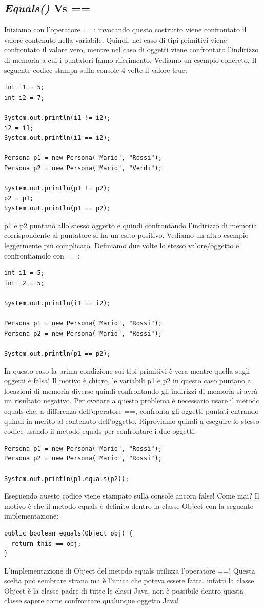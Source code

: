 \subsection{\textit{Equals()} Vs ==}
Iniziamo con l’operatore ==: invocando questo costrutto viene confrontato il valore contenuto nella variabile. Quindi, nel caso di tipi primitivi viene confrontato il valore vero, mentre nel caso di oggetti viene confrontato l’indirizzo di memoria a cui i puntatori fanno riferimento.
Vediamo un esempio concreto. Il seguente codice stampa sulla console 4 volte il valore true:
\begin{lstlisting}
int i1 = 5;
int i2 = 7;
 
System.out.println(i1 != i2);
i2 = i1;
System.out.println(i1 == i2);
 
Persona p1 = new Persona("Mario", "Rossi");
Persona p2 = new Persona("Mario", "Verdi");
 
System.out.println(p1 != p2);
p2 = p1;
System.out.println(p1 == p2);
\end{lstlisting}
p1 e p2 puntano allo stesso oggetto e quindi confrontando l’indirizzo di memoria corrispondente al puntatore si ha un esito positivo.
Vediamo un altro esempio leggermente più complicato. Definiamo due volte lo stesso valore/oggetto e confrontiamolo con ==:
\begin{lstlisting}
int i1 = 5;
int i2 = 5;
 
System.out.println(i1 == i2);
 
Persona p1 = new Persona("Mario", "Rossi");
Persona p2 = new Persona("Mario", "Rossi");
 
System.out.println(p1 == p2);
\end{lstlisting}
In questo caso la prima condizione sui tipi primitivi è vera mentre quella sugli oggetti è falsa! Il motivo è chiaro, le variabili p1 e p2 in questo caso puntano a locazioni di memoria diverse quindi confrontando gli indirizzi di memoria si avrà un risultato negativo. Per ovviare a questo problema è necessario usare il metodo equals che, a differenza dell’operatore ==, confronta gli oggetti puntati entrando quindi in merito al contenuto dell’oggetto.
Riproviamo quindi a eseguire lo stesso codice usando il metodo equals per confrontare i due oggetti:
\begin{lstlisting}
Persona p1 = new Persona("Mario", "Rossi");
Persona p2 = new Persona("Mario", "Rossi");
 
System.out.println(p1.equals(p2));	
\end{lstlisting}
Eseguendo questo codice viene stampato sulla console ancora false! Come mai? Il motivo è che il metodo equals è definito dentro la classe Object con la seguente implementazione:
\begin{lstlisting}
public boolean equals(Object obj) {
  return this == obj;
}
\end{lstlisting}
L’implementazione di Object del metodo equals utilizza l’operatore ==! Questa scelta può sembrare strana ma è l’unica che poteva essere fatta. infatti la classe Object è la classe padre di tutte le classi Java, non è possibile dentro questa classe sapere come confrontare qualunque oggetto Java! 

